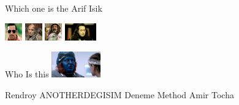 \documentclass{exam}
\begin{document}
\begin{questions}
\question Which one is the Arif Isik\newline
\begin{oneparchoices}
\choice \includegraphics[height=2em]{arifisik.jpg}
\choice \includegraphics[height=2em]{216.jpg}
\choice \includegraphics[height=2em]{faruk.jpg}
\choice \includegraphics[height=2em]{komutanlogar.jpeg}
\end{oneparchoices}
\question Who Is this\newline
\includegraphics[height=3em]{rendroy2.jpg} \newline
\begin{oneparchoices}
\choice Rendroy
\choice ANOTHERDEGISIM
\choice Deneme Method
\choice Amir Tocha
\end{oneparchoices}
\end{questions}
\end{document}
